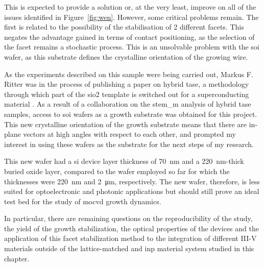 This is expected to provide a solution or, at the very least, improve on all of the issues identified in Figure~\ref{fig:wen}. However, some critical problems remain. The first is related to the possibility of the stabilisation of 2 different  facets. This negates the advantage gained in terms of contact positioning, as the selection of the  facet remains a stochastic process. This is an unsolvable problem with the \hkl[0 0 1] \acs{soi} wafer, as this substrate defines the crystalline orientation of the growing wire. 

As the experiments described on this sample were being carried out, Markus F. Ritter was in the process of publishing a paper on hybrid \acs{tase}, a methodology through which part of the \acs{sio2} template is switched out for a superconducting material \cite{Ritter2021}. As a result of a collaboration on the \acs{stem_m} analysis of hybrid \acs{tase} samples, access to \hkl[1 1 0] \acs{soi} wafers as a growth substrate was obtained for this project. This new crystalline orientation of the growth substrate means that there are in-plane  vectors at high angles with respect to each other, and prompted my interest in using these wafers as the substrate for the next steps of my research.

This new wafer had a \acs{si} device layer thickness of \qty{70}{\nano\metre} and a \qty{220}{\nano\metre}-thick buried oxide layer, compared to the \hkl[0 0 1] wafer employed so far for which the thicknesses were \qty{220}{\nano\metre} and \qty{2}{\micro\metre}, respectively. The new wafer, therefore, is less suited for optoelectronic and photonic applications but should still prove an ideal test bed for the study of \acs{mocvd} growth dynamics.

In particular, there are remaining questions on the reproducibility of the study, the yield of the growth stabilization, the optical properties of the devices and the application of this facet stabilization method to the integration of different III-V materials outside of the lattice-matched  and \acs{inp} material system studied in this chapter.










